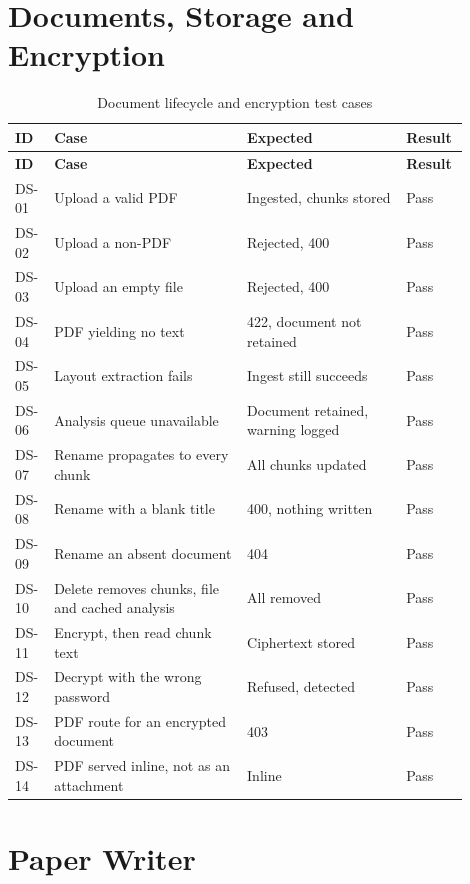 \documentclass[12pt,a4paper]{report}
\begin{document}
\section{Documents, Storage and Encryption}

\begin{longtable}{@{}p{0.07\linewidth}p{0.40\linewidth}p{0.33\linewidth}p{0.10\linewidth}@{}}
\caption{Document lifecycle and encryption test cases}\label{tab:ds}\\
\toprule
\textbf{ID} & \textbf{Case} & \textbf{Expected} & \textbf{Result} \\
\midrule
\endfirsthead
\toprule
\textbf{ID} & \textbf{Case} & \textbf{Expected} & \textbf{Result} \\
\midrule
\endhead

DS-01 & Upload a valid PDF & Ingested, chunks stored & Pass \\
DS-02 & Upload a non-PDF & Rejected, 400 & Pass \\
DS-03 & Upload an empty file & Rejected, 400 & Pass \\
DS-04 & PDF yielding no text & 422, document not retained & Pass \\
DS-05 & Layout extraction fails & Ingest still succeeds & Pass \\
DS-06 & Analysis queue unavailable & Document retained, warning logged
  & Pass \\
DS-07 & Rename propagates to every chunk & All chunks updated & Pass \\
DS-08 & Rename with a blank title & 400, nothing written & Pass \\
DS-09 & Rename an absent document & 404 & Pass \\
DS-10 & Delete removes chunks, file and cached analysis & All removed & Pass \\
DS-11 & Encrypt, then read chunk text & Ciphertext stored & Pass \\
DS-12 & Decrypt with the wrong password & Refused, detected & Pass \\
DS-13 & PDF route for an encrypted document & 403 & Pass \\
DS-14 & PDF served inline, not as an attachment & Inline & Pass \\
\bottomrule
\end{longtable}

\section{Paper Writer}
\end{document}
